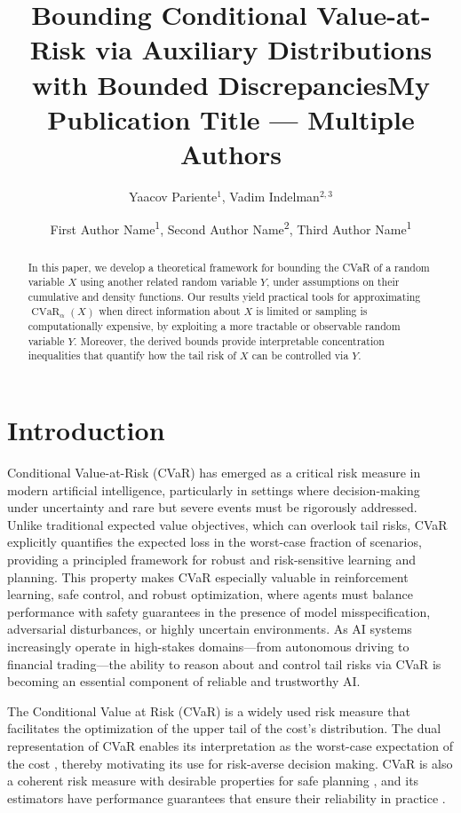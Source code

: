 \documentclass[letterpaper]{article} %
\title{Bounding Conditional Value-at-Risk via Auxiliary Distributions with Bounded Discrepancies}
\author{
Yaacov Pariente$^1$, Vadim Indelman$^{2,3}$\\
}
\title{My Publication Title --- Multiple Authors}
\author {
First Author Name\textsuperscript{\rm 1},
Second Author Name\textsuperscript{\rm 2},
Third Author Name\textsuperscript{\rm 1}
}
\begin{document}
\maketitle

\begin{abstract}
	In this paper, we develop a theoretical framework for bounding the CVaR of a random variable $X$ using another related random variable $Y$, under assumptions on their cumulative and density functions. Our results yield practical tools for approximating $\operatorname{CVaR}_\alpha(X)$ when direct information about $X$ is limited or sampling is computationally expensive, by exploiting a more tractable or observable random variable $Y$. Moreover, the derived bounds provide interpretable concentration inequalities that quantify how the tail risk of $X$ can be controlled via $Y$.
\end{abstract}


\section{Introduction}
Conditional Value-at-Risk (CVaR) has emerged as a critical risk measure in modern artificial intelligence, particularly in settings where decision-making under uncertainty and rare but severe events must be rigorously addressed. Unlike traditional expected value objectives, which can overlook tail risks, CVaR explicitly quantifies the expected loss in the worst-case fraction of scenarios, providing a principled framework for robust and risk-sensitive learning and planning. This property makes CVaR especially valuable in reinforcement learning, safe control, and robust optimization, where agents must balance performance with safety guarantees in the presence of model misspecification, adversarial disturbances, or highly uncertain environments. As AI systems increasingly operate in high-stakes domains—from autonomous driving to financial trading—the ability to reason about and control tail risks via CVaR is becoming an essential component of reliable and trustworthy AI.

The Conditional Value at Risk (CVaR) \cite{rockafellar2000optimization} is a widely used risk measure that facilitates the optimization of the upper tail of the cost's distribution. The dual representation of CVaR \cite{artzner1999coherent} enables its interpretation as the worst-case expectation of the cost \cite{chow2015risk}, thereby motivating its use for risk-averse decision making. CVaR is also a coherent risk measure with desirable properties for safe planning \cite{majumdar2020should}, and its estimators have performance guarantees that ensure their reliability in practice \cite{brown2007large,pmlr-v97-thomas19a}.
\end{document}
